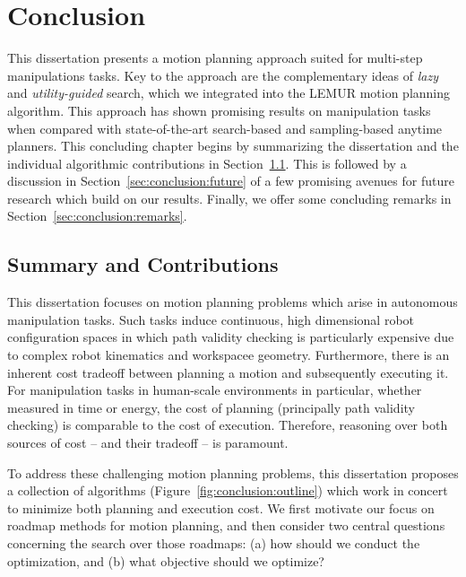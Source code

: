 \chapter{Conclusion}
\label{chap:conclusion}

This dissertation presents a motion planning approach suited for
multi-step manipulations tasks.
Key to the approach are the complementary ideas of \emph{lazy}
and \emph{utility-guided} search,
which we integrated into the LEMUR motion planning algorithm.
This approach has shown promising results on manipulation tasks
when compared with state-of-the-art
search-based and sampling-based anytime planners.
This concluding chapter begins by summarizing the dissertation
and the individual algorithmic contributions
in Section~\ref{sec:conclusion:summary}.
This is followed by a discussion in Section~\ref{sec:conclusion:future}
of a few promising avenues for future research
which build on our results.
Finally, we offer some concluding remarks
in Section~\ref{sec:conclusion:remarks}.


\section{Summary and Contributions}
\label{sec:conclusion:summary}

This dissertation focuses on motion planning problems
which arise in autonomous manipulation tasks.
Such tasks induce continuous, high dimensional robot configuration
spaces
in which path validity checking is particularly expensive
due to complex robot kinematics and workspacee geometry.
Furthermore,
there is an inherent cost tradeoff between
planning a motion and subsequently executing it.
For manipulation tasks in human-scale environments in particular,
whether measured in time or energy,
the cost of planning (principally path validity checking)
is comparable to the cost of execution.
Therefore,
reasoning over both sources of cost -- and their tradeoff --
is paramount.

To address these challenging motion planning problems,
this dissertation proposes a collection of algorithms
(Figure~\ref{fig:conclusion:outline})
which work in concert to minimize both planning and execution cost.
We first motivate our focus on roadmap methods for motion
planning,
and then consider two central questions concerning the search
over those roadmaps:
(a) how should we conduct the optimization,
and (b) what objective should we optimize?

